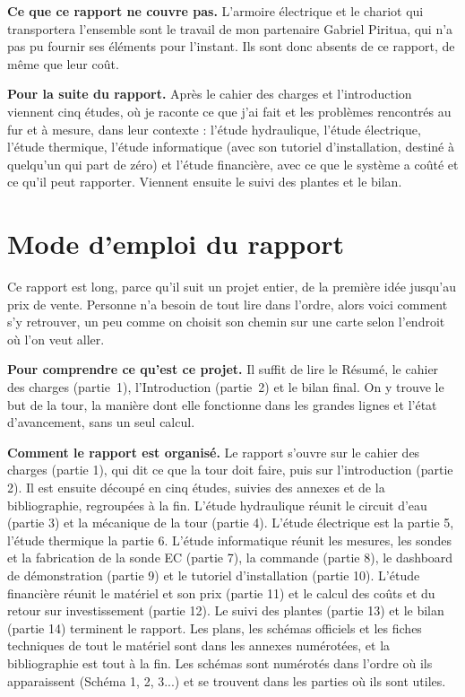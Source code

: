 \documentclass[11pt,a4paper]{article}
\newcounter{annexe}\newcounter{schema}
\begin{document}
\textbf{Ce que ce rapport ne couvre pas.} L'armoire électrique et le chariot qui transportera l'ensemble sont le travail de mon partenaire Gabriel Piritua, qui n'a pas pu fournir ses éléments pour l'instant. Ils sont donc absents de ce rapport, de même que leur coût.

\textbf{Pour la suite du rapport.} Après le cahier des charges et l'introduction viennent cinq études, où je raconte ce que j'ai fait et les problèmes rencontrés au fur et à mesure, dans leur contexte : l'étude hydraulique, l'étude électrique, l'étude thermique, l'étude informatique (avec son tutoriel d'installation, destiné à quelqu'un qui part de zéro) et l'étude financière, avec ce que le système a coûté et ce qu'il peut rapporter. Viennent ensuite le suivi des plantes et le bilan.

\clearpage
\section*{Mode d'emploi du rapport}

Ce rapport est long, parce qu'il suit un projet entier, de la première idée jusqu'au prix de vente. Personne n'a besoin de tout lire dans l'ordre, alors voici comment s'y retrouver, un peu comme on choisit son chemin sur une carte selon l'endroit où l'on veut aller.

\textbf{Pour comprendre ce qu'est ce projet.} Il suffit de lire le Résumé, le cahier des charges (partie~1), l'Introduction (partie~2) et le bilan final. On y trouve le but de la tour, la manière dont elle fonctionne dans les grandes lignes et l'état d'avancement, sans un seul calcul.

\textbf{Comment le rapport est organisé.} Le rapport s'ouvre sur le cahier des charges (partie 1), qui dit ce que la tour doit faire, puis sur l'introduction (partie 2). Il est ensuite découpé en cinq études, suivies des annexes et de la bibliographie, regroupées à la fin. L'étude hydraulique réunit le circuit d'eau (partie 3) et la mécanique de la tour (partie 4). L'étude électrique est la partie 5, l'étude thermique la partie 6. L'étude informatique réunit les mesures, les sondes et la fabrication de la sonde EC (partie 7), la commande (partie 8), le dashboard de démonstration (partie 9) et le tutoriel d'installation (partie 10). L'étude financière réunit le matériel et son prix (partie 11) et le calcul des coûts et du retour sur investissement (partie 12). Le suivi des plantes (partie 13) et le bilan (partie 14) terminent le rapport. Les plans, les schémas officiels et les fiches techniques de tout le matériel sont dans les annexes numérotées, et la bibliographie est tout à la fin. Les schémas sont numérotés dans l'ordre où ils apparaissent (Schéma 1, 2, 3...) et se trouvent dans les parties où ils sont utiles.
\end{document}
